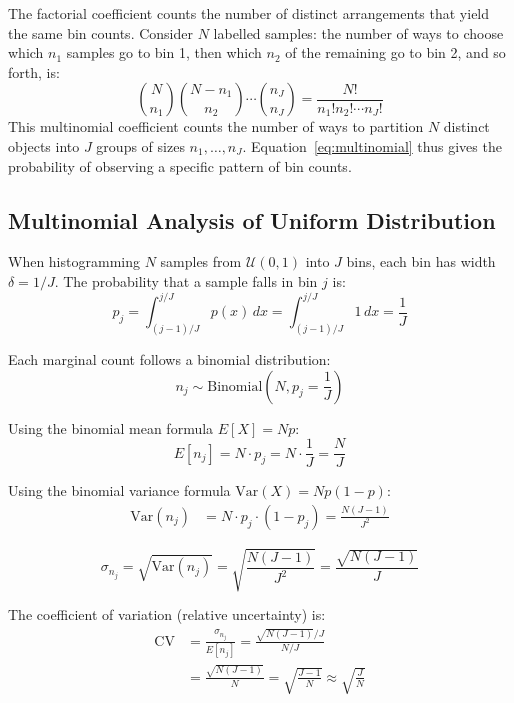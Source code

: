 \documentclass[
	a4paper, %
	10pt, %
	twoside, %
]{LTJournalArticle}
\begin{document}
The factorial coefficient counts the number of distinct arrangements that yield the same bin counts. Consider $N$ labelled samples: the number of ways to choose which $n_1$ samples go to bin 1, then which $n_2$ of the remaining go to bin 2, and so forth, is:
\begin{equation}
	\binom{N}{n_1}\binom{N-n_1}{n_2}\cdots\binom{n_J}{n_J} = \frac{N!}{n_1! n_2! \cdots n_J!}
\end{equation}
This multinomial coefficient counts the number of ways to partition $N$ distinct objects into $J$ groups of sizes $n_1, \ldots, n_J$. Equation~\eqref{eq:multinomial} thus gives the probability of observing a specific pattern of bin counts.

\subsection{Multinomial Analysis of Uniform Distribution}

When histogramming $N$ samples from $\mathcal{U}(0,1)$ into $J$ bins, each bin has width $\delta = 1/J$. The probability that a sample falls in bin $j$ is:
\begin{equation}
	p_j = \int_{(j-1)/J}^{j/J} p(x)\,dx = \int_{(j-1)/J}^{j/J} 1\,dx = \frac{1}{J}
\end{equation}

Each marginal count follows a binomial distribution:
\begin{equation}
	n_j \sim \text{Binomial}\left(N, p_j = \frac{1}{J}\right)
\end{equation}

Using the binomial mean formula $E[X] = Np$:
\begin{equation}
	E[n_j] = N \cdot p_j = N \cdot \frac{1}{J} = \frac{N}{J}
\end{equation}

Using the binomial variance formula $\text{Var}(X) = Np(1-p)$:
\begin{align}
	\text{Var}(n_j) & = N \cdot p_j \cdot (1 - p_j) = \frac{N(J-1)}{J^2}
\end{align}

\begin{equation}
	\sigma_{n_j} = \sqrt{\text{Var}(n_j)} = \sqrt{\frac{N(J-1)}{J^2}} = \frac{\sqrt{N(J-1)}}{J}
\end{equation}

The coefficient of variation (relative uncertainty) is:
\begin{align}
	\text{CV} & = \frac{\sigma_{n_j}}{E[n_j]} = \frac{\sqrt{N(J-1)}/J}{N/J} \nonumber       \\
	          & = \frac{\sqrt{N(J-1)}}{N} = \sqrt{\frac{J-1}{N}} \approx \sqrt{\frac{J}{N}}
\end{align}
\end{document}
